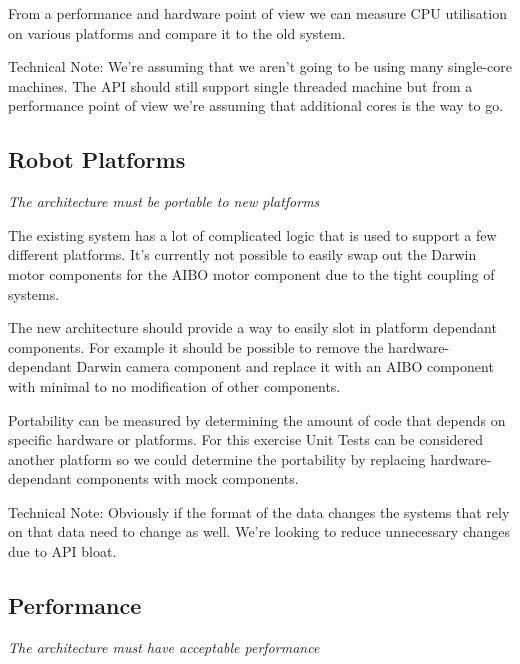 \documentclass[english,12pt]{scrartcl}
\newcommand{\requirement}[1]{\textit{#1}}
\begin{document}
            From a performance and hardware point of view we can measure CPU utilisation on various
            platforms and compare it to the old system.
            
            Technical Note: We're assuming that we aren't going to be using many single-core
            machines. The API should still support single threaded machine but from a performance
            point of view we're assuming that additional cores is the way to go.

        \subsection{Robot Platforms}
            \requirement{The architecture must be portable to new platforms}
            
            The existing system has a lot of complicated logic that is used to support a few
            different platforms. It's currently not possible to easily swap out the Darwin motor
            components for the AIBO motor component due to the tight coupling of systems.
            
            The new architecture should provide a way to easily slot in platform dependant
            components. For example it should be possible to remove the hardware-dependant Darwin
            camera component and replace it with an AIBO component with minimal to no modification
            of other components.
            
            Portability can be measured by determining the amount of code that depends on specific
            hardware or platforms. For this exercise Unit Tests can be considered another platform
            so we could determine the portability by replacing hardware-dependant components with
            mock components. 
            
            Technical Note: Obviously if the format of the data changes the systems that rely on
            that data need to change as well. We're looking to reduce unnecessary changes due to API
            bloat.
            
        
        \subsection{Performance}
            \requirement{The architecture must have acceptable performance}
            
\end{document}
